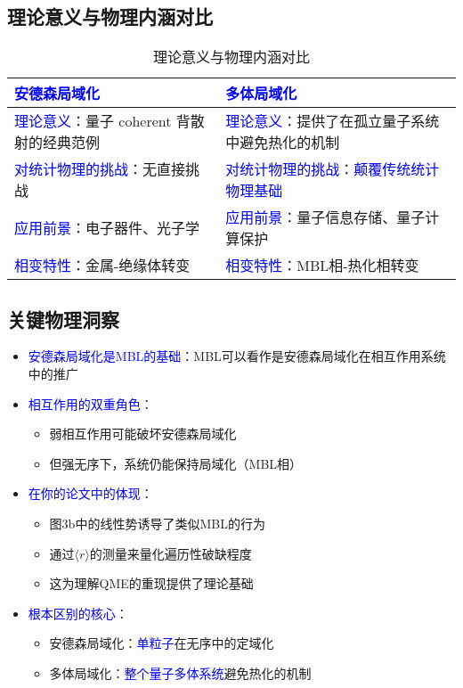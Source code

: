 \documentclass[11pt,a4paper]{article}
\begin{document}
\subsection{理论意义与物理内涵对比}

\begin{table}[H]
\centering
\caption{理论意义与物理内涵对比}
\begin{tabular}{|p{}|p{}|}
\hline
\textcolor{blue}{安德森局域化} & \textcolor{blue}{多体局域化} \\
\hline
\hline
\textcolor{blue}{理论意义}：量子 coherent 背散射的经典范例 & \textcolor{blue}{理论意义}：提供了在孤立量子系统中避免热化的机制 \\
\hline
\textcolor{blue}{对统计物理的挑战}：无直接挑战 & \textcolor{blue}{对统计物理的挑战}：\textcolor{blue}{颠覆传统统计物理基础} \\
\hline
\textcolor{blue}{应用前景}：电子器件、光子学 & \textcolor{blue}{应用前景}：量子信息存储、量子计算保护 \\
\hline
\textcolor{blue}{相变特性}：金属-绝缘体转变 & \textcolor{blue}{相变特性}：MBL相-热化相转变 \\
\hline
\end{tabular}
\end{table}

\subsection{关键物理洞察}

\begin{itemize}
\item \textcolor{blue}{安德森局域化是MBL的基础}：MBL可以看作是安德森局域化在相互作用系统中的推广

\item \textcolor{blue}{相互作用的双重角色}：
\begin{itemize}
\item 弱相互作用可能破坏安德森局域化
\item 但强无序下，系统仍能保持局域化（MBL相）
\end{itemize}

\item \textcolor{blue}{在你的论文中的体现}：
\begin{itemize}
\item 图3b中的线性势诱导了类似MBL的行为
\item 通过$\langle r \rangle$的测量来量化遍历性破缺程度
\item 这为理解QME的重现提供了理论基础
\end{itemize}

\item \textcolor{blue}{根本区别的核心}：
\begin{itemize}
\item 安德森局域化：\textcolor{blue}{单粒子}在无序中的定域化
\item 多体局域化：\textcolor{blue}{整个量子多体系统}避免热化的机制
\end{itemize}
\end{itemize}
\end{document}
